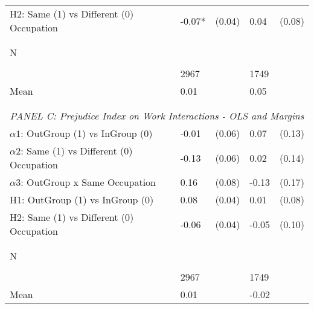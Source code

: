 \begin{tabular}{l*{4}{l}}
H2: Same (1) vs Different (0) Occupation&    -0.07*  &   (0.04)&     0.04   &   (0.08)\\
 
\\\\[-0.5cm] N \\\\[-0.6cm]&     2967   &         &     1749   &         \\
Mean            &     0.01&         &     0.05&         \\
 
\\[-0.6cm] \\  \multicolumn{5}{c}{\textit{PANEL C: Prejudice Index on Work Interactions - OLS and Margins}} \\  \midrule   
$\alpha1$: OutGroup (1) vs InGroup (0)&    -0.01   &   (0.06)&     0.07   &   (0.13)\\
$\alpha2$: Same (1) vs Different (0) Occupation&    -0.13   &   (0.06)&     0.02   &   (0.14)\\
$\alpha3$: OutGroup x Same Occupation&     0.16   &   (0.08)&    -0.13   &   (0.17)\\
 
H1: OutGroup (1) vs InGroup (0)&     0.08   &   (0.04)&     0.01   &   (0.08)\\
 
H2: Same (1) vs Different (0) Occupation&    -0.06   &   (0.04)&    -0.05   &   (0.10)\\
 
\\\\[-0.5cm] N \\\\[-0.6cm]&     2967   &         &     1749   &         \\
Mean            &     0.01&         &    -0.02&         \\
 
\bottomrule  \end{tabular}  
